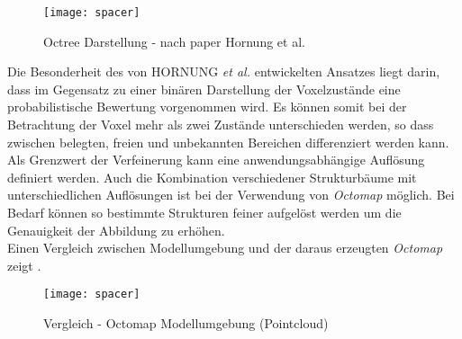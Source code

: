 \begin{figure}[!ht]
	\begin{center}
		\texttt{[image: spacer]}
		\caption{Octree Darstellung - nach paper Hornung et al.}
		\label{fig.octree}
	\end{center}
\end{figure}


Die Besonderheit des von HORNUNG \textit{et al.} entwickelten Ansatzes liegt darin, dass im Gegensatz zu einer binären Darstellung der Voxelzustände eine probabilistische Bewertung vorgenommen wird. Es können somit bei der Betrachtung der Voxel mehr als zwei Zustände unterschieden werden, so dass zwischen belegten, freien und unbekannten Bereichen differenziert werden kann. Als Grenzwert der Verfeinerung kann eine anwendungsabhängige Auflösung definiert werden. Auch die Kombination verschiedener Strukturbäume mit unterschiedlichen Auflösungen ist bei der Verwendung von \textit{Octomap} möglich. Bei Bedarf können so bestimmte Strukturen feiner aufgelöst werden um die Genauigkeit der Abbildung zu erhöhen.\\
Einen Vergleich zwischen Modellumgebung und der daraus erzeugten \textit{Octomap} zeigt .

\begin{figure}[!ht]
	\begin{center}
		\texttt{[image: spacer]}
		\caption{Vergleich - Octomap Modellumgebung (Pointcloud)}
		\label{fig.octomap}
	\end{center}
\end{figure}


